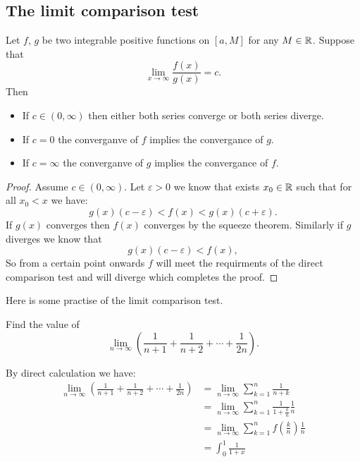 \documentclass[11pt,a4paper]{article}
\begin{document}
	\newpage
	
  \subsection{The limit comparison test}

  \begin{proposition}
    Let $f$, $g$ be two integrable positive functions on $[a,M]$ for any 
    $M \in \mathbb{R}$. Suppose that
    \[
      \lim_{x\to\infty} \frac{f(x)}{g(x)} = c.
    \]
    Then
    \begin{itemize}
      \item If $c \in (0,\infty)$ then either both series converge or both 
        series diverge.
      \item If $c = 0$ the converganve of $f$ implies the convergance of $g$.
      \item If $c = \infty$ the converganve of $g$ implies the convergance 
        of $f$.
    \end{itemize}
  \end{proposition}
  \begin{proof}
    Assume $c \in (0,\infty)$.
    Let $\varepsilon > 0$ we know that exists $x_0 \in \mathbb{R}$ such that for all 
    $x_0 < x$ we have:
    \[
      g(x)(c - \varepsilon) < f(x) < g(x)(c + \varepsilon).
    \]
    If $g(x)$ converges then $f(x)$ converges by the squeeze theorem.
    Similarly if $g$ diverges we know that
    \[
      g(x)(c - \varepsilon) < f(x),
    \]
    So from a certain point onwards $f$ will meet the requirments of the 
    direct comparison test and will diverge which completes the proof.
  \end{proof}
  
  Here is some practise of the limit comparison test.

  \begin{exercise}
    Find the value of
    \[
      \lim_{n\to\infty}
      \left(\frac 1{n+1} + \frac 1{n+2} + \cdots + \frac {1}{2n}\right).
    \]
  \end{exercise}
  \begin{solution}
    By direct calculation we have:
    \begin{align*}
    \lim_{n\to\infty}
    {\left(\frac {1}{n+1} + \frac {1}{n+2} + \cdots + \frac {1}{2n}\right)} 
    &= \lim_{n\to\infty}
    {\sum_{k=1}^{n}{\frac {1}{n+k}}} 
    \\
    &= \lim_{n\to\infty}
    {\sum_{k=1}^{n}{\frac {1}{1 + \frac {k}{n}}\frac {1}{n}}} 
    \\
    &= \lim_{n\to\infty}
    {\sum_{k=1}^{n} {f(\frac {k}{n})\frac {1}{n}}} 
    \\
    &= \int_{0}^{1}{\frac{1}{1+x}}
    \end{align*}
  \end{solution}
	
\end{document}
